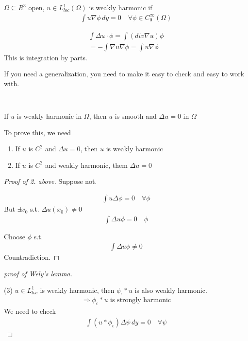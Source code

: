 \documentclass[11pt]{article}
\begin{document}
\vspace{7mm}
\begin{definition}
    $\Omega \subseteq  R^{3}$ open, $u \in L_{loc}^{1}(\Omega)$ is weakly harmonic
    if 
    \begin{align*}
        \int u \nabla \phi \, dy = 0 \quad \forall \phi \in C_{0}^{\infty}(\Omega)
    \end{align*}
\end{definition}
\begin{remark}
    \begin{align*}
        \int \Delta u \cdot \phi = \int (div \nabla u) \phi\\
        = - \int \nabla u \nabla \phi = \int u \nabla \phi
    \end{align*}
    This is integration by parts.
\end{remark}

If you need a generalization, you need to make it easy to check and easy
to work with.

\begin{lemma}
    \, 

    If $u$ is weakly harmonic in $\Omega$, then $u$ is smooth and
    $\Delta u = 0$ in $\Omega$
\end{lemma}

\vspace{7mm}
To prove this, we need 
\begin{enumerate}
    \item If $u$ is $C^{2}$ and $\Delta u = 0$, then $u$ is weakly harmonic
    \item If $u$ is $C^{2}$ and weakly harmonic, them $\Delta u =0$
\end{enumerate}

\begin{proof}[Proof of 2. above]
    Suppose not.

    \begin{align*}
        \int u \Delta \phi = 0 \quad \forall \phi
    \end{align*}
    But $\exists x_{0} $ s.t. $\Delta u(x_{0}) \neq 0$
    \begin{align*}
        \int \Delta u \phi = 0 \quad \phi
    \end{align*}

    Choose $\phi$ s.t.
    \begin{align*}
        \int \Delta u \phi \neq 0
    \end{align*}
    Countradiction.
\end{proof}

\begin{proof}[proof of Wely's lemma]
    \,

    (3) $u \in L_{loc}^{1}$ is weakly harmonic, then $\phi_{\epsilon}*u$ is 
    also weakly harmonic.
    \begin{align*}
        \Longrightarrow \phi_{\epsilon} * u \text{ is strongly harmonic}
    \end{align*}
    We need to check
    \begin{align*}
        \int (u * \phi_{\epsilon}) \Delta \psi \, dy = 0 \quad \forall \psi
    \end{align*}
\end{proof}
\end{document}
